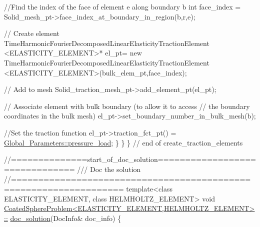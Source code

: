 \begin{DoxyCodeInclude}
{     \textcolor{comment}{//Find the index of the face of element e along boundary b}
     \textcolor{keywordtype}{int} face\_index = Solid\_mesh\_pt->face\_index\_at\_boundary\_in\_region(b,r,e);
     
     \textcolor{comment}{// Create element}
     TimeHarmonicFourierDecomposedLinearElasticityTractionElement
      <ELASTICITY\_ELEMENT>* el\_pt=
      \textcolor{keyword}{new} TimeHarmonicFourierDecomposedLinearElasticityTractionElement
      <ELASTICITY\_ELEMENT>(bulk\_elem\_pt,face\_index);   
     
     \textcolor{comment}{// Add to mesh}
     Solid\_traction\_mesh\_pt->add\_element\_pt(el\_pt);
     
     \textcolor{comment}{// Associate element with bulk boundary (to allow it to access}
     \textcolor{comment}{// the boundary coordinates in the bulk mesh)}
     el\_pt->set\_boundary\_number\_in\_bulk\_mesh(b); 
     
     \textcolor{comment}{//Set the traction function}
     el\_pt->traction\_fct\_pt() = \hyperlink{namespaceGlobal__Parameters_a0ddb3a77481b907fbb34f2e8d0a6eb9f}{Global\_Parameters::pressure\_load};  
    \}
  \}
\} \textcolor{comment}{// end of create\_traction\_elements}




\textcolor{comment}{//==============start\_of\_doc\_solution===============================}\textcolor{comment}{}
\textcolor{comment}{/// Doc the solution}
\textcolor{comment}{}\textcolor{comment}{//==================================================================}
\textcolor{keyword}{template}<\textcolor{keyword}{class} ELASTICITY\_ELEMENT, \textcolor{keyword}{class} HELMHOLTZ\_ELEMENT>
\textcolor{keywordtype}{void} \hyperlink{classCoatedSphereProblem_aaeade2a110160c002b2b45954a5a0edc}{CoatedSphereProblem<ELASTICITY\_ELEMENT,HELMHOLTZ\_ELEMENT>::}
\hyperlink{classCoatedSphereProblem_aaeade2a110160c002b2b45954a5a0edc}{doc\_solution}(DocInfo& doc\_info)
\{

}
\end{DoxyCodeInclude}
